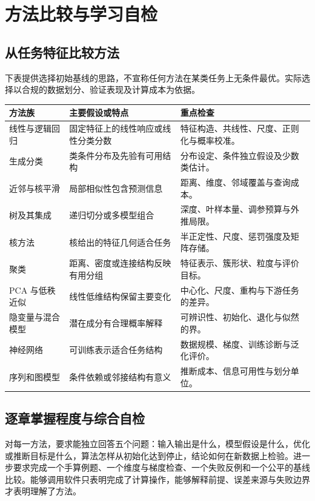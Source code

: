 \setcounter{chapter}{1} %
\chapter{方法比较与学习自检}
\label{app:ml-methods}

\section{从任务特征比较方法}

下表提供选择初始基线的思路，不宣称任何方法在某类任务上无条件最优。实际选择以合规的数据划分、验证表现及计算成本为依据。
\begin{longtable}{@{}L{3.0cm}L{5.0cm}L{5.7cm}@{}}
  \toprule
  方法族 & 主要假设或特点 & 重点检查 \\
  \midrule
  \endhead
  线性与逻辑回归 & 固定特征上的线性响应或线性分类分数 & 特征构造、共线性、尺度、正则化与概率校准。\\
  生成分类 & 类条件分布及先验有可用结构 & 分布设定、条件独立假设及少数类估计。\\
  近邻与核平滑 & 局部相似性包含预测信息 & 距离、维度、邻域覆盖与查询成本。\\
  树及其集成 & 递归切分或多模型组合 & 深度、叶样本量、调参预算与外推局限。\\
  核方法 & 核给出的特征几何适合任务 & 半正定性、尺度、惩罚强度及矩阵存储。\\
  聚类 & 距离、密度或连接结构反映有用分组 & 特征表示、簇形状、粒度与评价目标。\\
  PCA 与低秩近似 & 线性低维结构保留主要变化 & 中心化、尺度、重构与下游任务的差异。\\
  隐变量与混合模型 & 潜在成分有合理概率解释 & 可辨识性、初始化、退化与似然的界。\\
  神经网络 & 可训练表示适合任务结构 & 数据规模、梯度、训练诊断与泛化评价。\\
  序列和图模型 & 条件依赖或邻接结构有意义 & 推断成本、信息可用性与划分单位。\\
  \bottomrule
\end{longtable}

\section{逐章掌握程度与综合自检}

对每一方法，要求能独立回答五个问题：输入输出是什么，模型假设是什么，优化或推断目标是什么，算法怎样从初始化达到停止，结论如何在新数据上检验。进一步要求完成一个手算例题、一个维度与梯度检查、一个失败反例和一个公平的基线比较。能够调用软件只表明完成了计算操作，能够解释前提、误差来源与失败边界才表明理解了方法。





